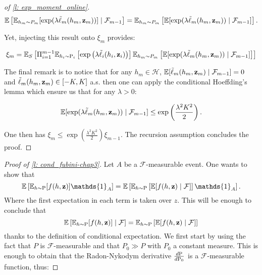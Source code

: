 \begin{noaddcontents}
\begin{proof}[of \cref{l: exp_moment_online}]
\[ \mathbb{E}
\left[ \mathbb{E}_{h_m\sim P_m} [\exp(\lambda \Tilde{\ell}_m(h_m,\z_m))] \mid \mathcal{F}_{m-1} \right] =  \mathbb{E}_{h_m\sim P_m} \left[ \mathbb{E}
[\exp(\lambda \Tilde{\ell}_m(h_m,\z_m)) \mid \mathcal{F}_{m-1}] \right] . \]

\noindent Yet, injecting this result onto $\xi_m$ provides:

\begin{align*}
  \xi_m = \mathbb{E}_S\left[ \Pi_{i=1}^{m-1}\mathbb{E}_{h_i \sim \P_{i}} \left[\exp\left(\lambda  \Tilde{\ell}_i(h_i,\z_i)\right)\right] \mathbb{E}_{h_m\sim P_m} \left[ \mathbb{E}
  [\exp(\lambda \Tilde{\ell}_m(h_m,\z_m)) \mid \mathcal{F}_{m-1}] \right] \right]
\end{align*}

The final remark is to notice that for any $h_m\in\mathcal{H}$, $\mathbb{E}[\Tilde{\ell}_m(h_m,\z_m)\mid \mathcal{F}_{m-1}] = 0$ and $\Tilde{\ell}_m(h_m,\z_m)\in [-K,K]$ a.s. then one can apply the conditional Hoeffding's lemma which ensure us that for any $\lambda>0$:

\[ \mathbb{E}
[\exp(\lambda \Tilde{\ell}_m(h_m,\z_m)) \mid \mathcal{F}_{m-1}] \leq \exp\left( \frac{\lambda^2K^2}{2}   \right). \]

One then has $\xi_m \leq \exp\left( \frac{\lambda^2K^2}{2}   \right) \xi_{m-1}$. The recursion assumption concludes the proof.


\end{proof}



\begin{proof}[Proof of \cref{l: cond_fubini-chap3}]
 Let $A$ be a $\mathcal{F}$-measurable event. One wants to show that
  \[ \mathbb{E}\left[\mathbb{E}_{h\sim \P} [f(h,\z)]\mathds{1}_A \right] = \mathbb{E}\left[\mathbb{E}_{h\sim \P} \left[ \mathbb{E}[f(h,\z)\mid \mathcal{F}] \right] \mathds{1}_A \right]. \]
  \noindent Where the first expectation in each term is taken over $z$. This will be enough to conclude that
  \[ \mathbb{E}\left[\mathbb{E}_{h\sim \P} [f(h,\z)]\mid \mathcal{F} \right] = \mathbb{E}_{h\sim \P} \left[ \mathbb{E}[f(h,\z)\mid \mathcal{F}] \right]   \]
  \noindent thanks to the definition of conditional expectation. We first start by using the fact that $P$ is $\mathcal{F}$-measurable and that $P_0 \gg P$ with $P_0$ a constant measure. This is enough to obtain that the Radon-Nykodym derivative $\frac{d\P}{d\P_0}$ is a $\mathcal{F}$-measurable function, thus:


\end{proof}
\end{noaddcontents}
